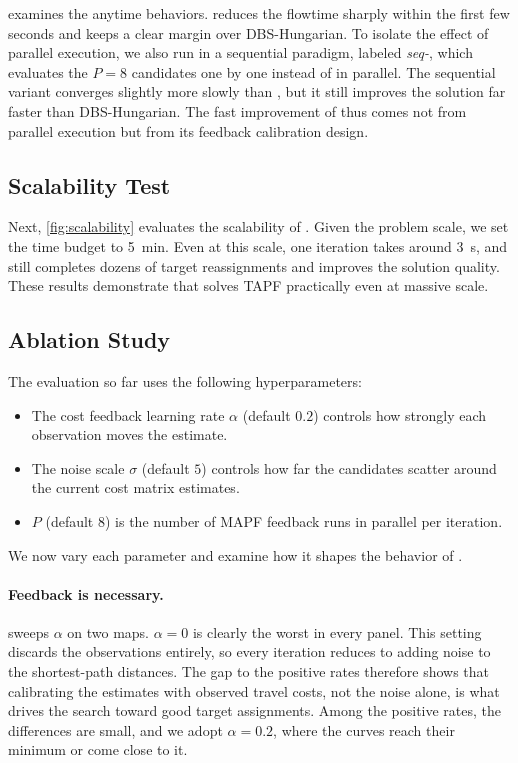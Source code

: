  examines the anytime behaviors.
\planner reduces the flowtime sharply within the first few seconds and keeps a clear margin over DBS-Hungarian.
To isolate the effect of parallel execution, we also run \planner in a sequential paradigm, labeled \emph{seq-\planner}, which evaluates the $P=8$ candidates one by one instead of in parallel.
The sequential variant converges slightly more slowly than \planner, but it still improves the solution far faster than DBS-Hungarian.
The fast improvement of \planner thus comes not from parallel execution but from its feedback calibration design.

\subsection{Scalability Test}

Next, \cref{fig:scalability} evaluates the scalability of \planner.
Given the problem scale, we set the time budget to \SI{5}{\minute}.
Even at this scale, one iteration takes around \SI{3}{\second}, and \planner still completes dozens of target reassignments and improves the solution quality.
These results demonstrate that \planner solves TAPF practically even at massive scale.

\subsection{Ablation Study}
\label{sec:design}
The evaluation so far uses the following hyperparameters:
\begin{itemize}
\item The cost feedback learning rate $\alpha$ (default $0.2$) controls how strongly each observation moves the estimate.
\item The noise scale $\sigma$ (default $5$) controls how far the candidates scatter around the current cost matrix estimates.
\item $P$ (default $8$) is the number of MAPF feedback runs in parallel per iteration.
\end{itemize}
We now vary each parameter and examine how it shapes the behavior of \planner.

\paragraph{Feedback is necessary.}

 sweeps $\alpha$ on two maps.
$\alpha = 0$ is clearly the worst in every panel.
This setting discards the observations entirely, so every iteration reduces to adding noise to the shortest-path distances.
The gap to the positive rates therefore shows that calibrating the estimates with observed travel costs, not the noise alone, is what drives the search toward good target assignments.
Among the positive rates, the differences are small, and we adopt $\alpha = 0.2$, where the curves reach their minimum or come close to it.

